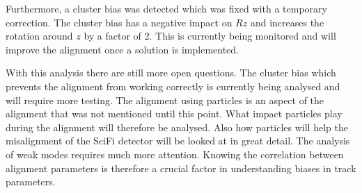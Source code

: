 Furthermore, a cluster bias was detected which was fixed with a temporary correction. The cluster bias has a negative impact on $Rz$ and increases the rotation around $z$ by a factor of 2. This is currently being monitored and will improve the alignment once a solution is implemented.


With this analysis there are still more open questions. The cluster bias which prevents the alignment from working correctly is currently being analysed and will require more testing.
The alignment using particles is an aspect of the alignment that was not mentioned until this point. What impact particles play during the alignment will therefore be analysed.
Also how particles will help the misalignment of the SciFi detector will be looked at in great detail.
The analysis of weak modes requires much more attention. Knowing the correlation between alignment parameters is therefore a crucial factor in understanding biases in track parameters.
